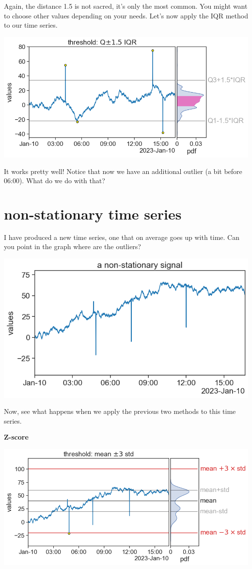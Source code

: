 \documentclass[
  letterpaper,
  DIV=11,
  numbers=noendperiod,
  oneside]{scrreprt}
\begin{document}
Again, the distance 1.5 is not sacred, it's only the most common. You
might want to choose other values depending on your needs. Let's now
apply the IQR method to our time series.

\includegraphics{outliers/outliers_1.5IQR.png}

It works pretty well! Notice that now we have an additional outlier (a
bit before 06:00). What do we do with that?

\hypertarget{non-stationary-time-series}{%
\section{non-stationary time series}\label{non-stationary-time-series}}

I have produced a new time series, one that on average goes up with
time. Can you point in the graph where are the outliers?

\includegraphics{outliers/signal_40_non_stationary.png}

Now, see what happens when we apply the previous two methods to this
time series.

\textbf{Z-score}

\includegraphics{outliers/outliers_3sigma_seed40.png}
\end{document}
